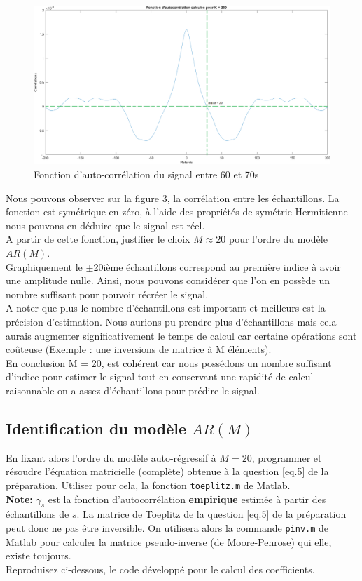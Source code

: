 \documentclass{article}
\begin{document}
\clearpage
\begin{figure}[!h]
    \centering
    \includegraphics[width=1\textwidth]{images/convo.png}
    \caption{Fonction d'auto-corrélation du signal entre 60 et 70s}
    \label{fig-binaire}
\end{figure}
Nous pouvons observer sur la figure 3, la corrélation entre les échantillons. La fonction est symétrique en zéro, à l'aide des propriétés de symétrie Hermitienne nous pouvons en déduire que le signal est réel. \\
\newline
A partir de cette fonction, justifier le choix $M \approx 20$ pour l'ordre du modèle $AR(M)$.\\
\newline
Graphiquement le $\pm$20ième échantillons correspond au première indice à avoir une amplitude nulle. Ainsi, nous pouvons considérer que l'on en possède un nombre suffisant pour pouvoir récréer le signal. \\
A noter que plus le nombre d'échantillons est important et meilleurs est la précision d'estimation. Nous aurions pu prendre plus d'échantillons mais cela aurais augmenter significativement le temps de calcul car certaine opérations sont coûteuse (Exemple : une inversions de matrice à M éléments). \\
En conclusion M = 20, est cohérent car nous possédons un nombre suffisant d'indice pour estimer le signal tout en conservant une rapidité de calcul raisonnable on a assez d’échantillons pour prédire le signal. 

\newpage
\subsection{Identification du modèle $AR(M)$}

En fixant alors l'ordre du modèle auto-régressif à $M=20$, programmer et résoudre l'équation matricielle (complète) obtenue à la question  \ref{eq.5} de la préparation. Utiliser pour cela, la fonction {\tt toeplitz.m} de Matlab. \\[1mm]
\textbf{Note:} $\gamma_s$ est la fonction d'autocorrélation  \textbf{empirique} estimée à partir des échantillons de $s$. La matrice de Toeplitz de la question \ref{eq.5} de la préparation peut donc ne pas être inversible. On utilisera alors la commande {\tt pinv.m} de Matlab pour calculer la matrice pseudo-inverse (de Moore-Penrose) qui elle, existe toujours.\\[1mm]
Reproduisez ci-dessous, le code développé pour le calcul des coefficients.
 
\end{document}
